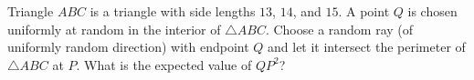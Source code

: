 Triangle $ABC$ is a triangle with side lengths $13$, $14$, and $15$. A point $Q$ is chosen uniformly at random in the interior of $\triangle{ABC}$. Choose a random ray (of uniformly random direction) with endpoint $Q$ and let it intersect the perimeter of $\triangle{ABC}$ at $P$. What is the expected value of $QP^2$?